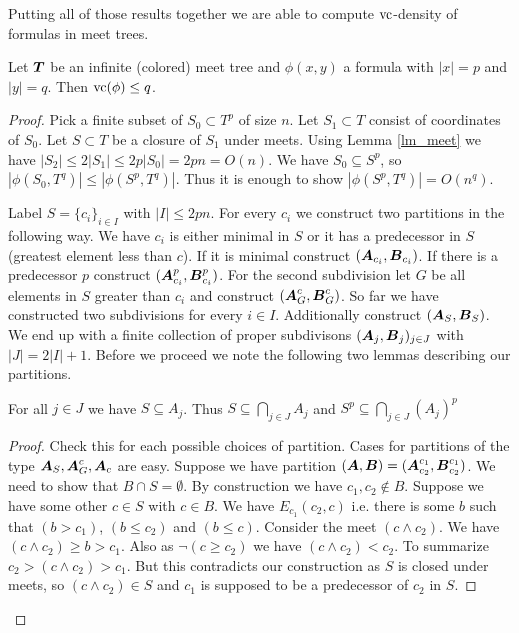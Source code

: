 \documentclass{amsart}
\DeclareMathOperator{\TT}{\boldface T}
\DeclareMathOperator{\A}{\boldface A}
\DeclareMathOperator{\B}{\boldface B}
\begin{document}
Putting all of those results together we are able to compute $\operatorname{vc}$-density of formulas in meet trees.

\begin{Theorem}
	Let $\TT$ be an infinite (colored) meet tree and $\phi(x, y)$ a formula with $|x| = p$ and $|y| = q$. Then $\operatorname{vc}(\phi) \leq q$.
\end{Theorem}

\begin{proof}
	Pick a finite subset of $S_0 \subset T^p$ of size $n$. Let $S_1 \subset T$ consist of coordinates of $S_0$. Let $S \subset T$ be a closure of $S_1$ under meets. Using Lemma \ref{lm_meet} we have $|S_2| \leq 2|S_1| \leq 2p|S_0| = 2pn = O(n)$. We have $S_0 \subseteq S^p$, so $|\phi(S_0, T^q)| \leq |\phi(S^p, T^q)|$. Thus it is enough to show $|\phi(S^p, T^q)| = O(n^q)$.
	
	Label $S = \{c_i\}_{i \in I}$ with $|I| \leq 2pn$. For every $c_i$ we construct two partitions in the following way. We have $c_i$ is either minimal in $S$ or it has a predecessor in $S$ (greatest element less than $c$). If it is minimal construct $(\A_{c_i}, \B_{c_i})$. If there is a predecessor $p$ construct $(\A^p_{c_i}, \B^p_{c_i})$. For the second subdivision let $G$ be all elements in $S$ greater than $c_i$ and construct $(\A^c_G, \B^c_G)$. So far we have constructed two subdivisions for every $i \in I$. Additionally construct $(\A_S, \B_S)$. We end up with a finite collection of proper subdivisons $(\A_j, \B_j)_{j \in J}$ with $|J| = 2|I| + 1$. Before we proceed we note the following two lemmas describing our partitions.
	
	\begin{Lemma}
		For all $j \in J$ we have $S \subseteq A_j$. Thus $S \subseteq \bigcap_{j \in J} A_j$ and $S^p \subseteq \bigcap_{j \in J} (A_j)^p$ 
	\end{Lemma}
	
	\begin{proof}
		Check this for each possible choices of partition. Cases for partitions of the type $\A_S, \A^c_G, \A_c$ are easy. Suppose we have partition $(\A, \B) = (\A^{c_1}_{c_2}, \B^{c_1}_{c_2})$. We need to show that $B \cap S = \emptyset$. By construction we have $c_1, c_2 \notin B$. Suppose we have some other $c \in S$ with $c \in B$. We have $E_{c_1}(c_2, c)$ i.e. there is some $b$ such that $(b > c_1)$, $(b \leq c_2)$ and $(b \leq c)$. Consider the meet $(c \wedge c_2)$. We have $(c \wedge c_2) \geq b > c_1$. Also as $\neg (c \geq c_2)$ we have $(c \wedge c_2) < c_2$. To summarize $c_2 > (c \wedge c_2) > c_1$. But this contradicts our construction as $S$ is closed under meets, so $(c \wedge c_2) \in S$ and $c_1$ is supposed to be a predecessor of $c_2$ in $S$.
	\end{proof}
	

\end{proof}
\end{document}
